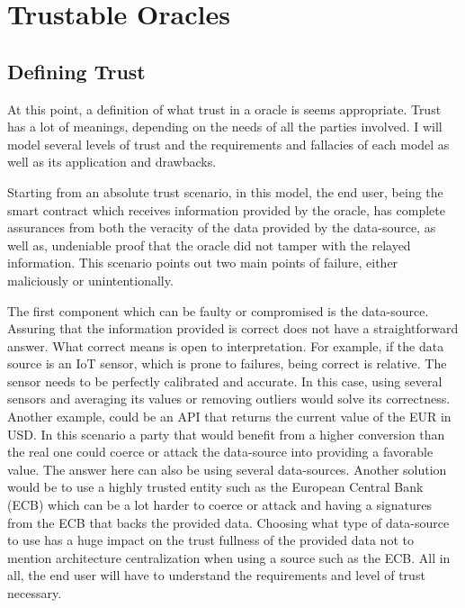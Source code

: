 \chapter{Trustable Oracles }\label{chap:chap3}

\section*{}






\section{Defining Trust}

At this point, a definition of what trust in a oracle is seems appropriate. Trust has a lot of meanings, depending on the needs of all the parties involved. I will model several levels of trust and the requirements and fallacies of each model as well as its application and drawbacks.

Starting from an absolute trust scenario, in this model, the end user, being the smart contract which receives information provided by the oracle, has complete assurances from both the veracity of the data provided by the data-source, as well as, undeniable proof that the oracle did not tamper with the relayed information. This scenario points out two main points of failure, either maliciously or unintentionally. 

The first component which can be faulty or compromised is the data-source. Assuring that the information provided is correct does not have a straightforward answer. What correct means is open to interpretation. For example, if the data source is an IoT sensor, which is prone to failures, being correct is relative. The sensor needs to be perfectly calibrated and accurate. In this case, using several sensors and averaging its values or removing outliers would solve its correctness. Another example, could be an API that returns the current value of the EUR in USD. In this scenario a party that would benefit from a higher conversion than the real one could coerce or attack the data-source into providing a favorable value. The answer here can also be using several data-sources. Another solution would be to use a highly trusted entity such as the European Central Bank (ECB) which can be a lot harder to coerce or attack and having a signatures from the ECB that backs the provided data. Choosing what type of data-source to use has a huge impact on the trust fullness of the provided data not to mention architecture centralization when using a source such as the ECB. All in all, the end user will have to understand the requirements and level of trust necessary.

